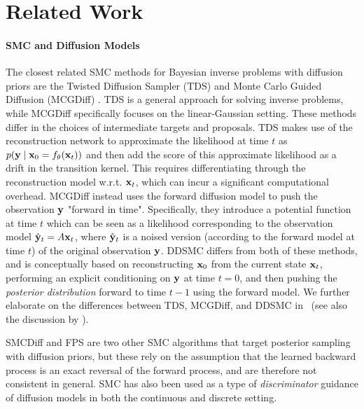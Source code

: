 \documentclass{proc}
\begin{document}
\section{Related Work}
\label{sec:related_work}
\paragraph{SMC and Diffusion Models} 
The closest related SMC methods for Bayesian inverse problems with diffusion priors are the Twisted Diffusion Sampler (TDS) \citep{wu_practical_2023} and Monte Carlo Guided Diffusion (MCGDiff) \citep{cardoso_monte_2023-2}. TDS is a general approach for solving inverse problems, while MCGDiff specifically focuses on the linear-Gaussian setting. These methods differ in the choices of intermediate targets and proposals.
TDS makes use of the reconstruction network to approximate the likelihood at time $t$ as $p(\mathbf{y} \mid \mathbf{x}_0 = f_\theta(\mathbf{x}_{t}))$ and then add the score of this approximate likelihood as a drift in the transition kernel. This requires differentiating through the reconstruction model w.r.t. $\mathbf{x}_{t}$, which can incur a significant computational overhead. MCGDiff instead uses the forward diffusion model to push the observation $\mathbf{y}$ "forward in time". Specifically, they introduce a potential function at time $t$ which can be seen as a likelihood corresponding to the observation model $\hat {\mathbf{y}}_t = A\mathbf{x}_t$, where $\hat {\mathbf{y}}_t$ is a noised version (according to the forward model at time $t$) of the original observation $\mathbf{y}$. 
DDSMC differs from both of these methods, and is conceptually based on reconstructing $\mathbf{x}_0$ from the current state $\mathbf{x}_t$, performing an explicit conditioning on $\mathbf{y}$ at time $t=0$, and then pushing the \emph{posterior distribution} forward to time $t-1$ using the forward model.
We further elaborate on the differences between TDS, MCGDiff, and DDSMC in ~(see also the discussion by \citet{Zhao2024rsta}). 

SMCDiff \citep{trippe_diffusion_2023} and FPS \citep{dou_diffusion_2023-1} are two other SMC algorithms that target posterior sampling with diffusion priors, but these rely on the assumption that the learned backward process is an exact reversal of the forward process, and are therefore not consistent in general. SMC has also been used as a type of \emph{discriminator} guidance \cite{kim_refining_2023-1} of diffusion models in both the continuous \cite{liu_correcting_2024} and discrete \cite{ekstrom_kelvinius_discriminator_2024} setting.
\end{document}
